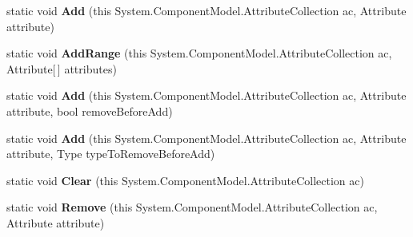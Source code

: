 \begin{DoxyCompactItemize}
\item 
\mbox{\label{class_tools_1_1_extensions_1_1_attribute_collection_extension_ab8658a0051f73f9f4ac4fad6c9f92d80}} 
static void {\bfseries Add} (this System.\+Component\+Model.\+Attribute\+Collection ac, Attribute attribute)
\item 
\mbox{\label{class_tools_1_1_extensions_1_1_attribute_collection_extension_a33c5dce086e305f95a2c4d0f456b0ec2}} 
static void {\bfseries Add\+Range} (this System.\+Component\+Model.\+Attribute\+Collection ac, Attribute\mbox{[}$\,$\mbox{]} attributes)
\item 
\mbox{\label{class_tools_1_1_extensions_1_1_attribute_collection_extension_ae122e3032259e96e06b2c5a8b6068774}} 
static void {\bfseries Add} (this System.\+Component\+Model.\+Attribute\+Collection ac, Attribute attribute, bool remove\+Before\+Add)
\item 
\mbox{\label{class_tools_1_1_extensions_1_1_attribute_collection_extension_a00e2a1bb7845f83e6993db81f5d79630}} 
static void {\bfseries Add} (this System.\+Component\+Model.\+Attribute\+Collection ac, Attribute attribute, Type type\+To\+Remove\+Before\+Add)
\item 
\mbox{\label{class_tools_1_1_extensions_1_1_attribute_collection_extension_a04c8ada5aba9ab4d0520a20e8a53efb4}} 
static void {\bfseries Clear} (this System.\+Component\+Model.\+Attribute\+Collection ac)
\item 
\mbox{\label{class_tools_1_1_extensions_1_1_attribute_collection_extension_ade20f0fa42facb24a2629304206712b4}} 
static void {\bfseries Remove} (this System.\+Component\+Model.\+Attribute\+Collection ac, Attribute attribute)
\item 
\mbox{\label{class_tools_1_1_extensions_1_1_attribute_collection_extension_af95554c417fa3da4344b9e0b26d37f07}} 

\end{DoxyCompactItemize}
